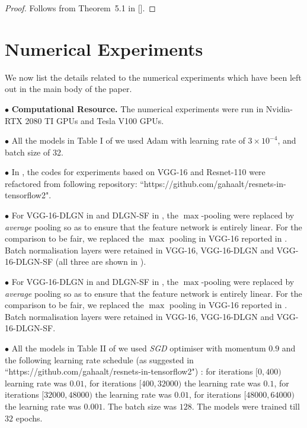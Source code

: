 \begin{proof}
Follows from Theorem~5.1 in [].
\end{proof}


\section{Numerical Experiments}\label{sec:expdetails}
We now list the details related to the numerical experiments which have been left out in the main body of the paper.

 $\bullet$ \textbf{Computational Resource.} The numerical experiments were run in Nvidia-RTX 2080 TI GPUs and Tesla V100 GPUs.

$\bullet$ All the models in Table I of  we used Adam \citep{adam} with learning rate of $3\times 10^{-4}$, and batch size of 32.

$\bullet$ In , the codes for experiments based on VGG-16 and Resnet-110  were refactored from following repository: ``https://github.com/gahaalt/resnets-in-tensorflow2".

$\bullet$ For VGG-16-DLGN in  and DLGN-SF in , the $\max$-pooling were replaced by \emph{average} pooling so as to ensure that the feature network is entirely linear. For the comparison to be fair, we replaced the $\max$ pooling in VGG-16 reported in . Batch normalisation layers were retained in VGG-16, VGG-16-DLGN and VGG-16-DLGN-SF (all three are shown in ).


$\bullet$ For VGG-16-DLGN in  and DLGN-SF in , the $\max$-pooling were replaced by \emph{average} pooling so as to ensure that the feature network is entirely linear. For the comparison to be fair, we replaced the $\max$ pooling in VGG-16 reported in . Batch normalisation layers were retained in VGG-16, VGG-16-DLGN and VGG-16-DLGN-SF.

$\bullet$ All the models in Table II of  we used \emph{SGD} optimiser with momentum $0.9$ and the following learning rate schedule (as suggested in ``https://github.com/gahaalt/resnets-in-tensorflow2") : for iterations $[0, 400)$ learning rate was $0.01$,  for iterations $[400, 32000)$ the learning rate was $ 0.1$, for iterations $[32000, 48000)$ the learning rate was $0.01$, for iterations $[48000, 64000)$ the learning rate was $0.001$. The batch size was $128$. The models were trained till $32$ epochs.

